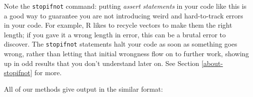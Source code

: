 \documentclass[
]{book}
\newenvironment{Shaded}{\begin{snugshade}}{\end{snugshade}}
\newcommand{\AttributeTok}[1]{\textcolor[rgb]{0.13,0.29,0.53}{#1}}
\newcommand{\ControlFlowTok}[1]{\textcolor[rgb]{0.13,0.29,0.53}{\textbf{#1}}}
\newcommand{\DecValTok}[1]{\textcolor[rgb]{0.00,0.00,0.81}{#1}}
\newcommand{\FunctionTok}[1]{\textcolor[rgb]{0.13,0.29,0.53}{\textbf{#1}}}
\newcommand{\NormalTok}[1]{#1}
\newcommand{\OtherTok}[1]{\textcolor[rgb]{0.56,0.35,0.01}{#1}}
\newcommand{\SpecialCharTok}[1]{\textcolor[rgb]{0.81,0.36,0.00}{\textbf{#1}}}
\newcommand{\StringTok}[1]{\textcolor[rgb]{0.31,0.60,0.02}{#1}}
\begin{document}
\begin{Shaded}
\end{Shaded}

Note the \texttt{stopifnot} command: putting \emph{assert statements} in your code like this is a good way to guarantee you are not introducing weird and hard-to-track errors in your code.
For example, R likes to recycle vectors to make them the right length; if you gave it a wrong length in error, this can be a brutal error to discover.
The \texttt{stopifnot} statements halt your code as soon as something goes wrong, rather than letting that initial wrongness flow on to further work, showing up in odd results that you don't understand later on.
See Section \ref{about-stopifnot} for more.

All of our methods give output in the similar format:
\end{document}
